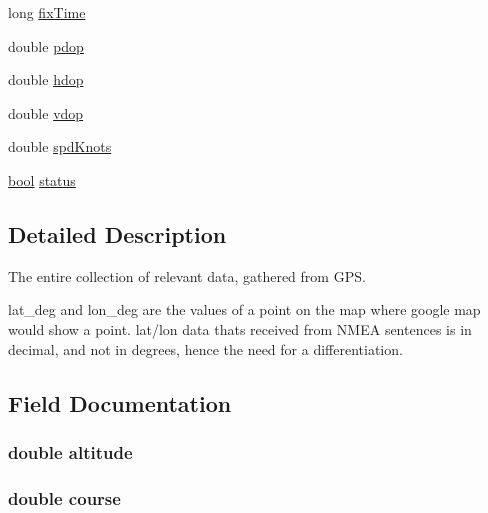 \begin{DoxyCompactItemize}
long \hyperlink{struct_full_g_p_s_data_a820d96504a74d9f1ab7ae4d962a878ba}{fix\+Time}
\item 
double \hyperlink{struct_full_g_p_s_data_a387b6cbd184865365f92d29fd1ac32c1}{pdop}
\item 
double \hyperlink{struct_full_g_p_s_data_a7ede759392ed439219bdbac4c8ede827}{hdop}
\item 
double \hyperlink{struct_full_g_p_s_data_a4001a0f05d0c57ebdb066d738098bff7}{vdop}
\item 
double \hyperlink{struct_full_g_p_s_data_aafd79f80d0c8c393f4ddad96148f6175}{spd\+Knots}
\item 
\hyperlink{types_8h_af6a258d8f3ee5206d682d799316314b1}{bool} \hyperlink{struct_full_g_p_s_data_ad1f0bff7112206922c9d5a87adad6f2b}{status}
\end{DoxyCompactItemize}


\subsection{Detailed Description}
The entire collection of relevant data, gathered from G\+PS. 

lat\+\_\+deg and lon\+\_\+deg are the values of a point on the map where google map would show a point. lat/lon data that\textquotesingle{}s received from N\+M\+EA sentences is in decimal, and not in degrees, hence the need for a differentiation. 

\subsection{Field Documentation}
\subsubsection[{\texorpdfstring{altitude}{altitude}}]{\setlength{\rightskip}{0pt plus 5cm}double altitude}\hypertarget{struct_full_g_p_s_data_a2b13d276aee0d9fd646c8fa3647e869b}{}\label{struct_full_g_p_s_data_a2b13d276aee0d9fd646c8fa3647e869b}
\subsubsection[{\texorpdfstring{course}{course}}]{\setlength{\rightskip}{0pt plus 5cm}double course}\hypertarget{struct_full_g_p_s_data_acaa2fde7e3fad7df8f5755347603d17b}{}\label{struct_full_g_p_s_data_acaa2fde7e3fad7df8f5755347603d17b}
